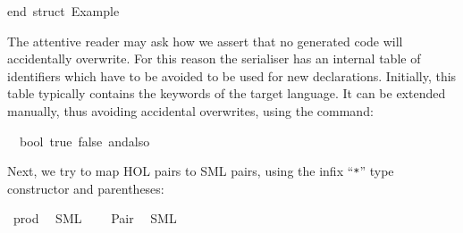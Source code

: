\begin{isabellebody}
\begin{isamarkuptext}
\isanewline
end{}\ {}{}struct\ Example{}{}\isanewline%
\end{isamarkuptext}%
\isamarkuptrue%
%
\endisatagquotetypewriter
{\isafoldquotetypewriter}%
%
\isadelimquotetypewriter
%
\endisadelimquotetypewriter
%
\begin{isamarkuptext}%
\noindent The attentive reader may ask how we assert that no
  generated code will accidentally overwrite.  For this reason the
  serialiser has an internal table of identifiers which have to be
  avoided to be used for new declarations.  Initially, this table
  typically contains the keywords of the target language.  It can be
  extended manually, thus avoiding accidental overwrites, using the
  \hypertarget{command.code-reserved}{\hyperlink{command.code-reserved}{\mbox{}}} command:%
\end{isamarkuptext}%
\isamarkuptrue%
%
\isadelimquote
%
\endisadelimquote
%
\isatagquote
{}\isamarkupfalse%
\ {}{}{}\ bool\ true\ false\ andalso%
\endisatagquote
{\isafoldquote}%
%
\isadelimquote
%
\endisadelimquote
%
\begin{isamarkuptext}%
\noindent Next, we try to map HOL pairs to SML pairs, using the
  infix ``\verb|*|'' type constructor and parentheses:%
\end{isamarkuptext}%
\isamarkuptrue%
%
\isadeliminvisible
%
\endisadeliminvisible
%
\isataginvisible
%
\endisataginvisible
{\isafoldinvisible}%
%
\isadeliminvisible
%
\endisadeliminvisible
%
\isadelimquotett
%
\endisadelimquotett
%
\isatagquotett
{}\isamarkupfalse%
\ prod\isanewline
\ \ {}SML\ \ {}\ {}{}{}{}\isanewline
{}\isamarkupfalse%
\ Pair\isanewline
\ \ {}SML\ {}{}{}{}{}{}{}{}\ {}{}{}{}{}{}%

\end{isabellebody}
